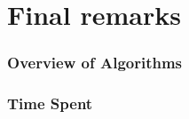 \documentclass[10pt,a4paper]{article}
\begin{document}

\part{Final remarks}


\section{Overview of Algorithms}


\section{Time Spent}
\end{document}
